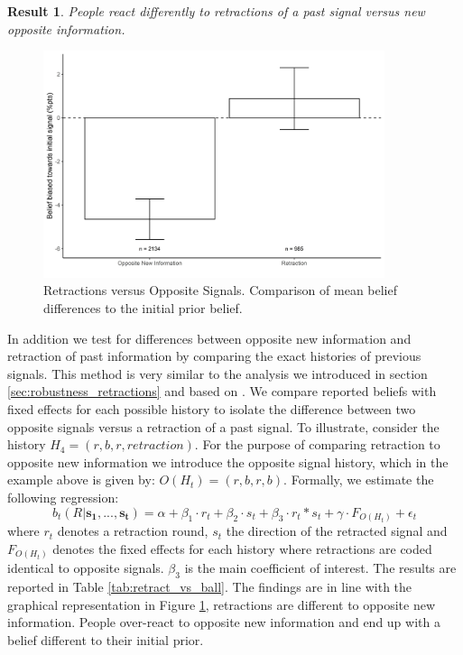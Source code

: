 \documentclass{article}
\newtheorem{result}{Result}
\newenvironment{Result}{\begin{result} \rm }{\end{result}}
\begin{document}
\begin{Result}
    People react differently to retractions of a past signal versus new opposite information.
\end{Result}

\begin{figure}
    \centering
    \includegraphics[width=10cm]{Fig/02_fig_retract_diff_vs_opposite_ball_all.jpg}
    \caption{Retractions versus Opposite Signals. Comparison of mean belief differences to the initial prior belief.}
    \label{fig:retract_vs_opposite}
\end{figure}

In addition we test for differences between opposite new information and retraction of past information by comparing the exact histories of previous signals. This method is very similar to the analysis we introduced in section \ref{sec:robustness_retractions} and based on \cite{Goncalves2022}. We compare reported beliefs with fixed effects for each possible history to isolate the difference between two opposite signals versus a retraction of a past signal. To illustrate, consider the history $H_4=(r,b,r,retraction)$. For the purpose of comparing retraction to opposite new information we introduce the opposite signal history, which in the example above is given by: $O(H_t)=(r,b,r,b)$. Formally, we estimate the following regression:
\begin{equation}
    b_t(R|\mathbf{s_1},...,\mathbf{s_t})=\alpha + \beta_1 \cdot r_t + \beta_2 \cdot s_t + \beta_3 \cdot r_t*s_t + \gamma \cdot F_{O(H_t)} + \epsilon_t
\end{equation}
where $r_t$ denotes a retraction round, $s_t$ the direction of the retracted signal and $F_{O(H_t)}$ denotes the fixed effects for each history where retractions are coded identical to opposite signals. $\beta_3$ is the main coefficient of interest. The results are reported in Table \ref{tab:retract_vs_ball}. The findings are in line with the graphical representation in Figure \ref{fig:retract_vs_opposite}, retractions are different to opposite new information. People over-react to opposite new information and end up with a belief different to their initial prior.
\end{document}
